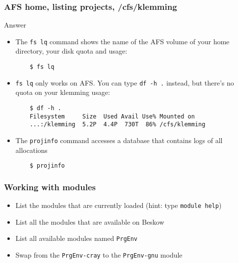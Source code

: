 \begin{frame}[fragile]
  \frametitle{AFS home, listing projects, /cfs/klemming}
\begin{exampleblock}{{Answer}}
    \verbatimfont{\footnotesize}
    \begin{itemize}
    \item The \verb|fs lq| command shows the name of the AFS volume of your home directory, your disk quota and usage:
    \begin{verbatim}
    $ fs lq
    \end{verbatim}

    \item \verb|fs lq| only works on AFS. You can type \verb|df -h .| instead, but there's no quota on your klemming usage:
    \begin{verbatim}
    $ df -h .
    Filesystem     Size  Used Avail Use% Mounted on
    ...:/klemming  5.2P  4.4P  730T  86% /cfs/klemming
    \end{verbatim}

    \item The \verb|projinfo| command accesses a database that contains logs of all allocations 
    \begin{verbatim}
    $ projinfo
    \end{verbatim}

    \end{itemize}

\end{exampleblock}
\end{frame}




\begin{frame}[fragile]
  \frametitle{Working with modules}
\begin{itemize}
  \item List the modules that are currently loaded (hint: type \verb|module help|)
  \item List all the modules that are available on Beskow
  \item List all available modules named \verb|PrgEnv|
  \item Swap from the \verb|PrgEnv-cray| to the \verb|PrgEnv-gnu| module
\end{itemize}
\end{frame}


